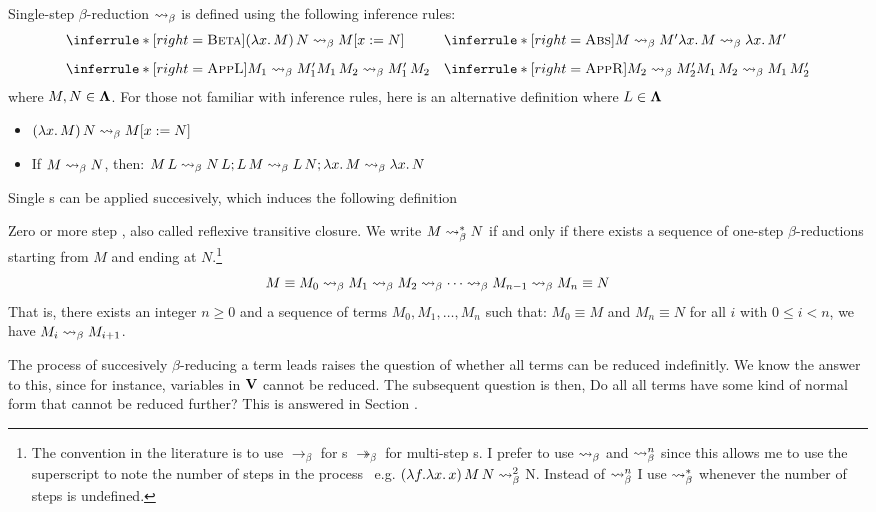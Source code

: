 \begin{definition} Single-step $\beta$-reduction $\mathrel{\leadsto}_\beta$ is defined using the following inference rules:
\[
\begin{array}{@{}l@{\quad}l@{}}
  \inferrule*[right=\textsc{Beta}]
    { }
    { (\lam{x}{M})\,N \step M\subst{x}{N} }
  &
  \inferrule*[right=\textsc{Abs}]
    { M \step M' }
    { \lam{x}{M} \step \lam{x}{M'} } \\[2ex]
  \inferrule*[right=\textsc{AppL}]
    { M_1 \step M_1' }
    { M_1\,M_2 \step M_1'\,M_2 }
  &
  \inferrule*[right=\textsc{AppR}]
    { M_2 \step M_2' }
    { M_1\,M_2 \step M_1\,M_2' }
\end{array}
\]
where \( M, N \in \mathbf{\Lambda} \). For those not familiar with inference rules, here is an alternative definition where \( L \in \mathbf{\Lambda} \)
\begin{itemize}
\item \( (\lambda x.\,M)\,N \mathrel{\leadsto}_\beta M[x := N] \)
\item If $M \mathrel{\leadsto}_\beta N$, then: \( M\,L \mathrel{\leadsto}_\beta N\,L; L\,M \mathrel{\leadsto}_\beta L\,N; \lambda x.\,M \mathrel{\leadsto}_\beta \lambda x.\,N \)
\end{itemize}
\end{definition} 
Single \bred s can be applied succesively, which induces the following definition
\begin{definition} Zero or more step \bred, also called reflexive transitive closure. We write $M \mathrel{\leadsto}_\beta^* N$ if and only if there exists a sequence of one-step $\beta$-reductions starting from $M$ and ending at $N$.\footnote{The convention in the literature is to use $\rightarrow_\beta$ for \bred s $\twoheadrightarrow_\beta$ for multi-step \bred s. I prefer to use $\mathrel{\leadsto}_\beta$ and $\mathrel{\leadsto}_\beta^n$ since this allows me to use the superscript to note the number of steps in the process \bred \ e.g. $ (\lambda f. \lambda x . \, x) \, M \, N \mathrel{\leadsto}_\beta^2 $ N. Instead of $\mathrel{\leadsto}_\beta^n$ I use $\mathrel{\leadsto}_\beta^*$ whenever the number of steps is undefined.}
  \label{def:zero-more-bred}
  \[
    M \equiv M_0 \mathrel{\leadsto}_\beta M_1 \mathrel{\leadsto}_\beta M_2 \mathrel{\leadsto}_\beta \cdots \mathrel{\leadsto}_\beta M_{n-1} \mathrel{\leadsto}_\beta M_n \equiv N
  \]
  That is, there exists an integer $n \geq 0$ and a sequence of terms $M_0, M_1, \dots, M_n$ such that: $ M_0 \equiv M $ and $ M_n \equiv N $ for all $ i $ with $ 0 \leq i < n $, we have $ M_i \mathrel{\leadsto}_\beta M_{i+1} $.
\end{definition}
The process of succesively $\beta$-reducing a term leads raises the question of whether all terms can be reduced indefinitly. We know the answer to this, since for instance, variables in $\mathbf{V}$ cannot be reduced. The subsequent question is then, Do all all terms have some kind of normal form that cannot be reduced further? This is answered in Section .
